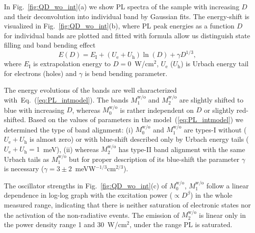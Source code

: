 In Fig.~\ref{fig:QD_wo_int}(a) we show PL spectra of the sample with increasing $D$ and their deconvolution into individual band by Gaussian fits. The energy-shift is visualized in Fig.~\ref{fig:QD_wo_int}(b), where PL peak energies as a function $D$ for individual bands are plotted and fitted with %
%
formula allow us distinguish state filling and band bending effect~\cite{Abramkin_blueshift_analytical}
\begin{equation}
E(D)=E_\mathrm{I}+\left(U_\mathrm{e}+U_\mathrm{h}\right) \ln\left(D \right)+\gamma D^{1/3}, \label{eq:PL_intmodel}
\end{equation}
%
where $E_\mathrm{I}$ is extrapolation energy to $D=0$~W/cm$^2$, $U_\mathrm{e}$ ($U_\mathrm{h}$) is Urbach energy tail for electrons (holes) and $\gamma$ is bend bending parameter.%

The energy evolutions of the bands are well characterized with~Eq.~(\ref{eq:PL_intmodel}). The bands $M_1^\mathrm{w/o}$ and $M_2^\mathrm{w/o}$ are slightly shifted to blue with increasing $D$, whereas $M_0^\mathrm{w/o}$ is rather independent on $D$ or slightly red-shifted. Based on the values of parameters in the model~(\ref{eq:PL_intmodel}) we determined the type of band alignment: (i) $M_0^\mathrm{w/o}$ and $M_1^\mathrm{w/o}$ are types-I without ($U_\mathrm{e}+U_\mathrm{h}$ is almost zero) or with blue-shift described only by Urbach energy tails ($U_\mathrm{e}+U_\mathrm{h}=1$~meV), (ii) whereas $M_2^\mathrm{w/o}$ has type-II band alignment with the same Urbach tails as $M_1^\mathrm{w/o}$ but for proper description of its blue-shift the parameter $\gamma$ is necessary ($\gamma=3\pm2$~meVW$^{-1/3}$cm$^{2/3}$).





The oscillator strengths in Fig.~\ref{fig:QD_wo_int}(c) of $M_0^\mathrm{w/o}$, $M_1^\mathrm{w/o}$ follow a linear dependence in log-log graph with the excitation power ($\propto D^\beta$) in the whole measured range, indicating that there is neither saturation of electronic states nor the activation of the non-radiative events. The emission of $M_2^\mathrm{w/o}$ is linear only in the power density range 1 and 30~W/cm$^2$, under the range PL is saturated.

